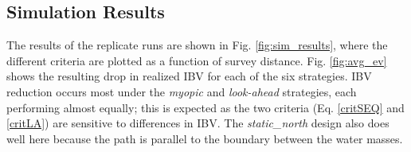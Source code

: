 \documentclass[aoas]{imsart}
\begin{document}
\subsection{Simulation Results}

The results of the replicate runs are shown in Fig. \ref{fig:sim_results}, where
the different criteria are plotted as a function of survey
distance. Fig. \ref{fig:avg_ev} shows the resulting drop in realized IBV for
each of the six strategies. IBV reduction occurs most under the
\textit{myopic} and \textit{look-ahead} strategies, each performing
almost equally; this is expected as the two criteria
(Eq. \eqref{critSEQ} and \eqref{critLA}) are sensitive to differences
in IBV. The \textit{static\_north} design also does well here because
the path is parallel to the boundary between the water masses.
\end{document}
